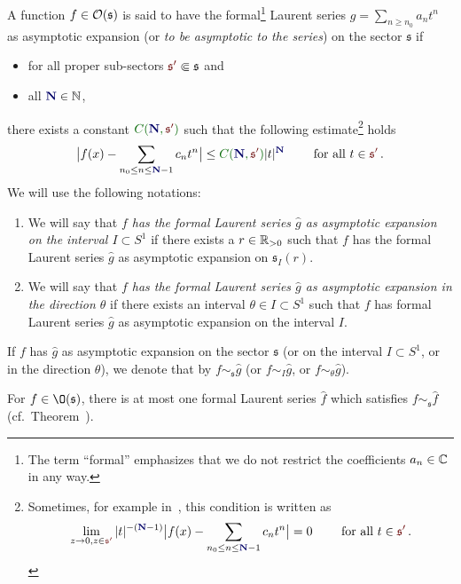 \begin{defn}
  \def\myN{\textbf{\textcolor{blue!40!black}{N}}}
  \def\mySect{\textcolor{red!40!black}{\mathfrak{s}'}}
  \def\myConst{\textcolor{green!40!black}{C(\myN,\mySect)}}
  A function $f\in\mathcal{O}(\mathfrak{s})$ is said to have the
  formal\footnote{The term ``formal'' emphasizes that we do not restrict the
  coefficients $a_n\in\mathbb{C}$ in any way.} Laurent series
  $\hat g=\sum_{n\geq n_0}a_nt^n$ as asymptotic expansion (or \emph{to be
  asymptotic to the series}) on the sector $\mathfrak{s}$ if
  \begin{itemize}
    \item for all proper sub-sectors $\mySect\Subset\mathfrak{s}$ and
    \item all $\myN\in\N$,
  \end{itemize}
  there exists a constant $\myConst$ such that the following
  estimate\footnote{Sometimes, for example in~\cite{sabbah_cimpa90}, this
    condition is written as
    \[
      \lim_{z\to0,z\in{\mySect}}
      |t|^{-(\myN-1)}
      \bigl|
        f(x)-\sum_{n_0\leq n\leq \myN-1}c_nt^n
      \bigr|=0
      \qquad \text{ for all } t\in \mySect \,.
    \]} holds
  \[
    \bigl|
      f(x)-\sum_{n_0\leq n\leq \myN-1}c_nt^n
    \bigr|
    \leq \myConst|t|^{\myN} \qquad \text{ for all }t\in \mySect \,.
  \]
  We will use the following notations:
  \begin{enumerate}
    \item We will say that \emph{$f$ has the formal Laurent series $\hat g$ as
      asymptotic expansion on the interval $I\subset S^1$} if there exists a
      $r\in\mathbb{R}_{>0}$ such that $f$ has the formal Laurent series $\hat g$ as
      asymptotic expansion on $\mathfrak{s}_I(r)$.
    \item We will say that \emph{$f$ has the formal Laurent series $\hat g$ as
      asymptotic expansion in the direction $\theta$} if there exists an
      interval $\theta\in I\subset S^1$ such that $f$ has formal Laurent series
      $\hat g$ as asymptotic expansion on the interval $I$.
  \end{enumerate}
\end{defn}
If $f$ has $\hat g$ as asymptotic expansion on the sector $\mathfrak{s}$ (or on
the interval $I\subset S^1$, or in the direction $\theta$), we denote that by
$f\sim_{\mathfrak{s}}\hat g$ (or $f\sim_{I}\hat g$, or
$f\sim_{\theta}\hat g$).\label{page:notationForAsymptoticExpansion}

\begin{thm}
  For $f\in\O(\mathfrak{s})$, there is at most one formal Laurent series $\hat
  f$ which satisfies $f\sim_{\mathfrak{s}}\hat f$
  (cf.\ Theorem~\cite[Thm.XI-1-5]{hsieh2012basic}).
\end{thm}


